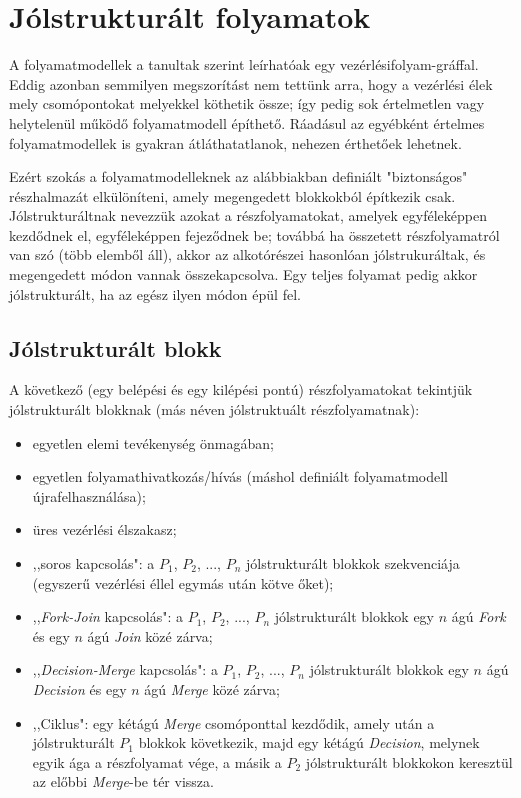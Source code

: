 
\section{Jólstrukturált folyamatok}\label{sec:jolstrukturalt-folyamatok}

A folyamatmodellek a tanultak szerint leírhatóak egy vezérlésifolyam-gráffal. Eddig azonban semmilyen megszorítást nem tettünk arra, hogy a vezérlési élek mely csomópontokat melyekkel köthetik össze; így pedig sok értelmetlen vagy helytelenül működő folyamatmodell építhető. Ráadásul az egyébként értelmes folyamatmodellek is gyakran átláthatatlanok, nehezen érthetőek lehetnek. 

Ezért szokás a folyamatmodelleknek az alábbiakban definiált "biztonságos" részhalmazát elkülöníteni, amely megengedett blokkokból építkezik csak. Jólstrukturáltnak nevezzük azokat a részfolyamatokat, amelyek egyféleképpen kezdődnek el, egyféleképpen fejeződnek be; továbbá ha összetett részfolyamatról van szó (több elemből áll), akkor az alkotórészei hasonlóan jólstrukuráltak, és megengedett módon vannak összekapcsolva. Egy teljes folyamat pedig akkor jólstrukturált, ha az egész ilyen módon épül fel.

\subsection{Jólstrukturált blokk}

A következő (egy belépési és egy kilépési pontú) részfolyamatokat tekintjük jólstrukturált blokknak (más néven jólstruktuált részfolyamatnak):

\begin{itemize}
\item egyetlen elemi tevékenység önmagában;
\item egyetlen folyamathivatkozás/hívás (máshol definiált folyamatmodell újrafelhasználása);
\item üres vezérlési élszakasz;
\item ,,soros kapcsolás": a $P_1$, $P_2$, ..., $P_n$ jólstrukturált blokkok szekvenciája (egyszerű vezérlési éllel egymás után kötve őket);
\item ,,\emph{Fork-Join} kapcsolás": a $P_1$, $P_2$, ..., $P_n$ jólstrukturált blokkok egy $n$ ágú \emph{Fork} és egy $n$ ágú \emph{Join} közé zárva; 
\item ,,\emph{Decision-Merge} kapcsolás": a $P_1$, $P_2$, ..., $P_n$ jólstrukturált blokkok egy $n$ ágú \emph{Decision} és egy $n$ ágú \emph{Merge} közé zárva;
\item ,,Ciklus": egy kétágú \emph{Merge} csomóponttal kezdődik, amely után a jólstrukturált $P_1$ blokkok következik, majd egy kétágú \emph{Decision}, melynek egyik ága a részfolyamat vége, a másik a $P_2$ jólstrukturált blokkokon keresztül az előbbi \emph{Merge}-be tér vissza.
\end{itemize}

